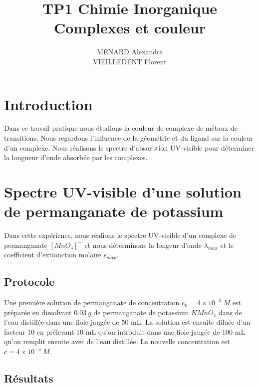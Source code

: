 \documentclass[12pt]{article}
\title{\textbf{TP1 Chimie Inorganique} \\ Complexes et couleur}
\author{MENARD Alexandre \\ VIEILLEDENT Florent}
\begin{document}
\maketitle

\section*{Introduction}

Dans ce travail pratique nous étudions la couleur de complexe de métaux de transitions.
Nous regardons l'influence de la géométrie et du ligand sur la couleur d'un complexe.
Nous réalisons le spectre d'absorbtion UV-visible pour déterminer la longueur d'onde absorbée par les complexes.

\section{Spectre UV-visible d'une solution de permanganate de potassium}

Dans cette expérience, nous réalions le spectre UV-visible d'un complexe de permanganate $[MnO_4]^-$ et nous déterminons la longeur d'onde $\lambda_{max}$ et le coefficient d'extionction molaire $\epsilon_{max}$.

\subsection{Protocole}

Une première solution de permanganate de concentration $c_0=4 \times 10^{-3} \ M $ est préparée en dissolvant $0.03 \ g$ de permanganate de potassium $KMnO_4$ dans de l'eau distillée dans une fiole jaugée de 50 mL.
La solution est ensuite diluée d'un facteur 10 en prélevant 10 mL qu'on introduit dans une fiole jaugée de 100 mL qu'on remplit ensuite avec de l'eau distillée.
La nouvelle concentration est $c=4 \times 10^{-4} \ M $.

\newpage
\subsection{Résultats}
\end{document}
